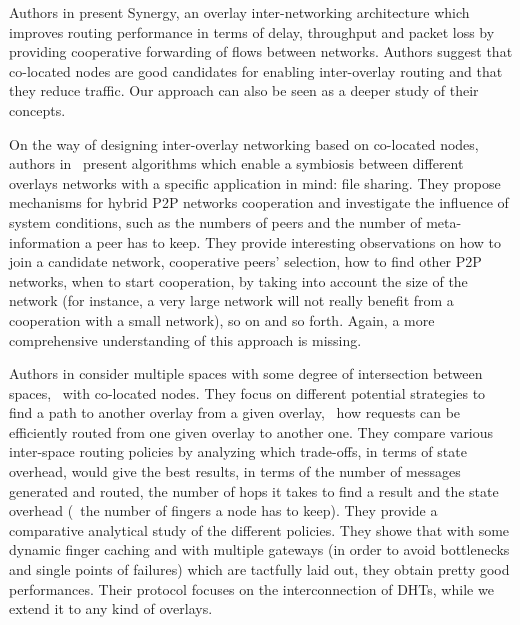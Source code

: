%
Authors in \cite{kwon_synergy:overlay_2005} present Synergy, an
overlay inter-networking architecture which improves routing
performance in terms of delay, throughput and packet loss by providing
cooperative forwarding of flows between networks. Authors suggest that
co-located nodes are good candidates for enabling inter-overlay
routing and that they reduce traffic. Our approach can also be seen as
a deeper study of their concepts.

On the way of designing inter-overlay networking based on co-located
nodes, authors in~\cite{junjiro_design_2006} present algorithms which
enable a symbiosis between different overlays networks with a
specific application in mind: file sharing. They propose mechanisms
for hybrid P2P networks cooperation and investigate the influence of
system conditions, such as the numbers of peers and the number of
meta-information a peer has to keep. They provide interesting
observations on how to join a candidate network, cooperative peers'
selection, how to find other P2P networks, when to start cooperation,
by taking into account the size of the network (for instance, a very
large network will not really benefit from a cooperation with a small
network), so on and so forth. Again, a more comprehensive
understanding of this approach is missing.


Authors in \cite{furtado_multiple_2007} consider multiple spaces with
some degree of intersection between spaces, \ie\ with co-located
nodes. They focus on different potential strategies to find a path
to another overlay from a given overlay, \ie\ how requests can be
efficiently routed from one given overlay to another one. They
compare various inter-space routing policies by analyzing which
trade-offs, in terms of state overhead, would give the best results,
in terms of the number of messages generated and routed, the number of
hops it takes to find a result and the state overhead (\ie\ the number
of fingers a node has to keep). They provide a comparative analytical
study of the different policies. They showe that with some dynamic
finger caching and with multiple gateways (in order to avoid
bottlenecks and single points of failures) which are tactfully laid
out, they obtain pretty good performances. Their protocol focuses on the 
interconnection of DHTs, while we extend it to any kind of overlays.

